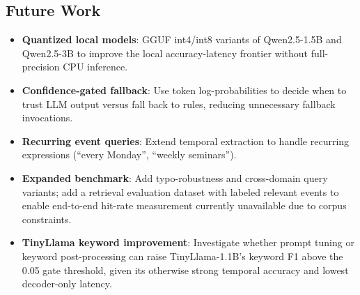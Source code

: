 \documentclass[conference]{IEEEtran}
\begin{document}
\subsection{Future Work}

\begin{itemize}
    \item \textbf{Quantized local models}: GGUF int4/int8 variants of Qwen2.5-1.5B and Qwen2.5-3B to improve the local accuracy-latency frontier without full-precision CPU inference.
    \item \textbf{Confidence-gated fallback}: Use token log-probabilities to decide when to trust LLM output versus fall back to rules, reducing unnecessary fallback invocations.
    \item \textbf{Recurring event queries}: Extend temporal extraction to handle recurring expressions (``every Monday'', ``weekly seminars'').
    \item \textbf{Expanded benchmark}: Add typo-robustness and cross-domain query variants; add a retrieval evaluation dataset with labeled relevant events to enable end-to-end hit-rate measurement currently unavailable due to corpus constraints.
    \item \textbf{TinyLlama keyword improvement}: Investigate whether prompt tuning or keyword post-processing can raise TinyLlama-1.1B's keyword F1 above the 0.05 gate threshold, given its otherwise strong temporal accuracy and lowest decoder-only latency.
\end{itemize}



\end{document}
